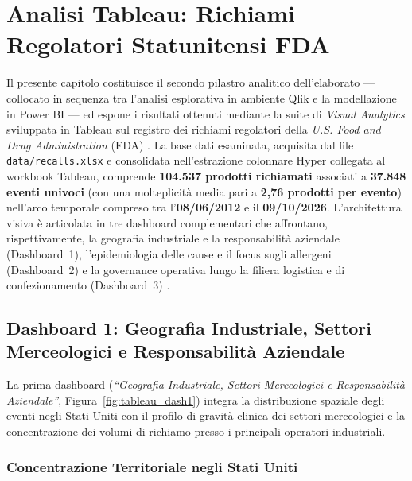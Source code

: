 \chapter{Analisi Tableau: Richiami Regolatori Statunitensi FDA}
\label{chap:tableau}

Il presente capitolo costituisce il secondo pilastro analitico dell'elaborato --- collocato in sequenza tra l'analisi esplorativa in ambiente Qlik e la modellazione in Power BI --- ed espone i risultati ottenuti mediante la suite di \textit{Visual Analytics} sviluppata in Tableau sul registro dei richiami regolatori della \textit{U.S. Food and Drug Administration} (FDA) \citep{fda_recalls_portal,tableau_docs}. La base dati esaminata, acquisita dal file \texttt{data/recalls.xlsx} e consolidata nell'estrazione colonnare Hyper collegata al workbook Tableau, comprende \textbf{104.537 prodotti richiamati} associati a \textbf{37.848 eventi univoci} (con una molteplicità media pari a \textbf{2,76 prodotti per evento}) nell'arco temporale compreso tra l'\textbf{08/06/2012} e il \textbf{09/10/2026}. L'architettura visiva è articolata in tre dashboard complementari che affrontano, rispettivamente, la geografia industriale e la responsabilità aziendale (Dashboard~1), l'epidemiologia delle cause e il focus sugli allergeni (Dashboard~2) e la governance operativa lungo la filiera logistica e di confezionamento (Dashboard~3) \citep{few2013}.

\section{Dashboard 1: Geografia Industriale, Settori Merceologici e Responsabilità Aziendale}
\label{sec:tableau_dash1}

La prima dashboard (\textit{``Geografia Industriale, Settori Merceologici e Responsabilità Aziendale''}, Figura~\ref{fig:tableau_dash1}) integra la distribuzione spaziale degli eventi negli Stati Uniti con il profilo di gravità clinica dei settori merceologici e la concentrazione dei volumi di richiamo presso i principali operatori industriali.


\subsection{Concentrazione Territoriale negli Stati Uniti}

